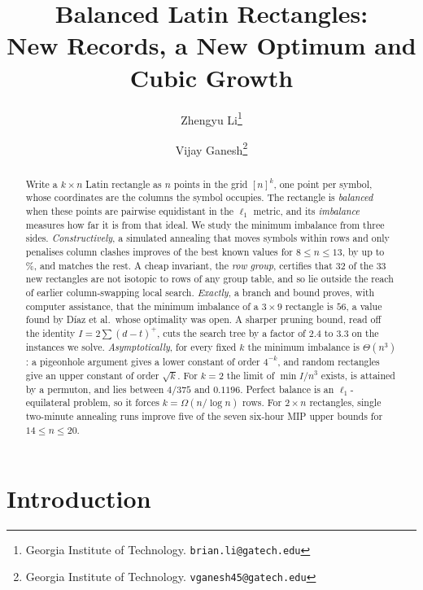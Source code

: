 \documentclass[11pt]{article}
\title{\bfseries Balanced Latin Rectangles:\\[2pt]
\large New Records, a New Optimum and Cubic Growth}
\author{Zhengyu Li\thanks{Georgia Institute of Technology. \texttt{brian.li@gatech.edu}}
  \and Vijay Ganesh\thanks{Georgia Institute of Technology. \texttt{vganesh45@gatech.edu}}}
\date{}
\theoremstyle{plain}
\theoremstyle{definition}
\theoremstyle{remark}
\begin{document}
\maketitle

\begin{abstract}
\noindent
Write a $k\times n$ Latin rectangle as $n$ points in the grid $[n]^k$, one point per symbol,
whose coordinates are the columns the symbol occupies. The rectangle is \emph{balanced} when
these points are pairwise equidistant in the $\ell_1$ metric, and its \emph{imbalance}
measures how far it is from that ideal. We study the minimum imbalance from three sides.
\emph{Constructively}, a simulated annealing that moves symbols within rows and only penalises
column clashes improves \NumImproved{} of the \NumCells{} best known values for $8\le n\le 13$,
by up to \MaxGain\%, and matches the rest. A cheap invariant, the \emph{row group}, certifies
that 32 of the 33 new rectangles are not isotopic to rows of any group table, and so lie
outside the reach of earlier column-swapping local search.
\emph{Exactly}, a branch and bound proves, with computer assistance, that the minimum imbalance
of a $3\times 9$ rectangle is $56$, a value found by Díaz et al.\ whose optimality was open. A
sharper pruning bound, read off the identity $I=2\sum(d-t)^+$, cuts the search tree by a
factor of $2.4$ to $3.3$ on the instances we solve.
\emph{Asymptotically}, for every fixed $k$ the minimum imbalance is $\Theta(n^3)$: a pigeonhole
argument gives a lower constant of order $4^{-k}$, and random rectangles give an upper constant
of order $\sqrt k$. For $k=2$ the limit of $\min I/n^3$ exists, is attained by a permuton, and lies
between $4/375$ and $0.1196$. Perfect balance is an $\ell_1$-equilateral problem, so
it forces $k=\Omega(n/\log n)$ rows.
For $2\times n$ rectangles, single two-minute annealing runs improve five of the seven six-hour MIP
upper bounds for $14\le n\le 20$.
\end{abstract}

\section{Introduction}
\end{document}
